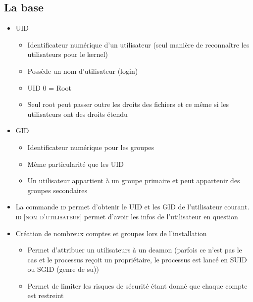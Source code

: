 \documentclass[a4paper]{article}
\begin{document}
    \subsection{La base}
    \begin{itemize}[label=\textbullet, font=\Large]
      \item \textsc{UID}
      \begin{itemize}[label=, font=\scriptsize]
        \item Identificateur numérique d'un utilisateur (seul manière de reconnaître les utilisateurs pour le kernel)
        \item Possède un nom d'utilisateur (login)
        \item UID 0 = Root
        \item Seul root peut passer outre les droits des fichiers et ce même si les utilisateurs ont des droits étendu
      \end{itemize}
      \item \textsc{GID}
      \begin{itemize}[label=, font=\scriptsize]
        \item Identificateur numérique pour les groupes
        \item Même particularité que les UID
        \item Un utilisateur appartient à un groupe primaire et peut appartenir des groupes secondaires
      \end{itemize}
      \item La commande \textsc{id} permet d'obtenir le UID et les GID de l'utilisateur courant. \textsc{id [nom d'utilisateur]} permet d'avoir les infos de l'utilisateur en question
      \item Création de nombreux comptes et groupes lors de l'installation
      \begin{itemize}[label=, font=\scriptsize]
        \item Permet d'attribuer un utilisateurs à un deamon (parfois ce n'est pas le cas et le processus reçoit un propriétaire, le processus est lancé en SUID ou SGID (genre de su))
        \item Permet de limiter les risques de sécurité étant donné que chaque compte est restreint
      \end{itemize}
    \end{itemize}
\end{document}
